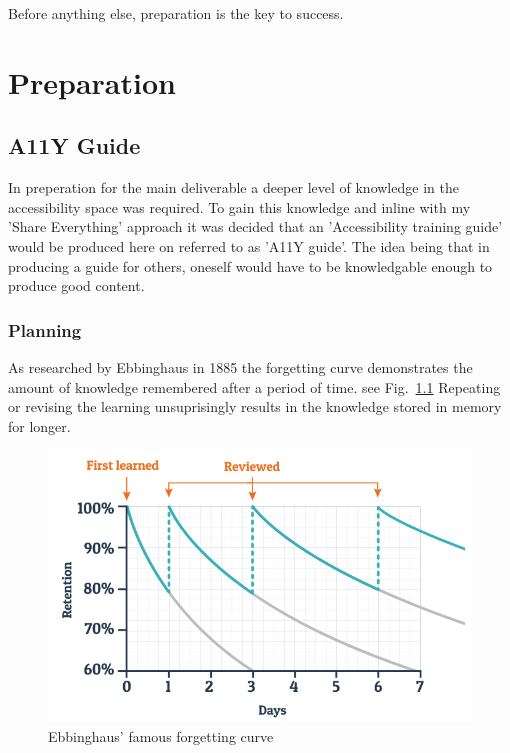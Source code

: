 \begin{savequote}[75mm]
Before anything else, preparation is the key to success.
\end{savequote}

\chapter{Preparation}
\section{A11Y Guide}
In preperation for the main deliverable a deeper level of knowledge in the
accessibility space was required. To gain this knowledge and inline with my
'Share Everything' approach it was decided that an 'Accessibility
training guide' would be produced here on referred to as 'A11Y guide'. The idea
being that in producing a guide for others, oneself would have to be
knowledgable enough to produce good content.

\subsection{Planning}

As researched by Ebbinghaus in 1885 the forgetting curve demonstrates the
amount of knowledge remembered after a period of time. see Fig.~\ref{fig:ebbinghaus}
Repeating or revising the learning unsuprisingly results in the knowledge
stored in memory for longer.

\begin{figure}
\includegraphics[width=\textwidth]{figures/ebbinghaus}
\caption[Short figure name.]{Ebbinghaus' famous forgetting curve
\label{fig:ebbinghaus}}
\end{figure}

